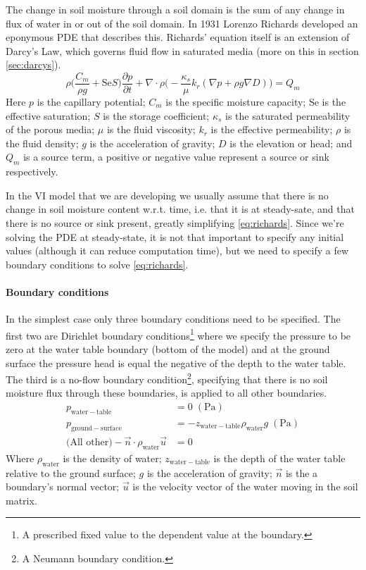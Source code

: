 The change in soil moisture through a soil domain is the sum of any change in flux of water in or out of the soil domain.
In 1931 Lorenzo Richards\cite{richards_capillary_1931} developed an eponymous PDE that describes this.
Richards' equation itself is an extension of Darcy's Law, which governs fluid flow in saturated media (more on this in section \ref{sec:darcys}).
\begin{equation}\label{eq:richards}
  \rho \Big( \frac{C_m}{\rho g} + \mathrm{Se}S \Big) \frac{\partial p}{\partial t} +
  \nabla \cdot \rho \Big( -\frac{\kappa_s}{\mu} k_r (\nabla p + \rho g \nabla D)\Big) =
  Q_m
\end{equation}
Here $p$ is the capillary potential; $C_m$ is the specific moisture capacity; $\mathrm{Se}$ is the effective saturation; $S$ is the storage coefficient; $\kappa_s$ is the saturated permeability of the porous media; $\mu$ is the fluid viscosity; $k_r$ is the effective permeability; $\rho$ is the fluid density; $g$ is the acceleration of gravity; $D$ is the elevation or head; and $Q_m$ is a source term, a positive or negative value represent a source or sink respectively.\par

In the VI model that we are developing we usually assume that there is no change in soil moisture content w.r.t. time, i.e. that it is at steady-sate, and that there is no source or sink present, greatly simplifying \eqref{eq:richards}.
Since we're solving the PDE at steady-state, it is not that important to specify any initial values (although it can reduce computation time), but we need to specify a few boundary conditions to solve \eqref{eq:richards}.

\paragraph{Boundary conditions}

In the simplest case only three boundary conditions need to be specified.
The first two are Dirichlet boundary conditions\footnote{A prescribed fixed value to the dependent value at the boundary.} where we specify the pressure to be zero at the water table boundary (bottom of the model) and at the ground surface the pressure head is equal the negative of the depth to the water table.
The third is a no-flow boundary condition\footnote{A Neumann boundary condition.}, specifying that there is no soil moisture flux through these boundaries, is applied to all other boundaries.
\begin{align}\label{eq:richards_bc}
  p_\mathrm{water-table} &= 0 \; \mathrm{(Pa)}\\
  p_\mathrm{ground-surface} &=  -z_\mathrm{water-table}\rho_\mathrm{water} g \; \mathrm{(Pa)} \\
  \text{(All other)} -\vec{n}\cdot\rho_\mathrm{water}\vec{u} &= 0
\end{align}
Where $\rho_\mathrm{water}$ is the density of water; $z_\mathrm{water-table}$ is the depth of the water table relative to the ground surface; $g$ is the acceleration of gravity; $\vec{n}$ is the a boundary's normal vector; $\vec{u}$ is the velocity vector of the water moving in the soil matrix.\par
